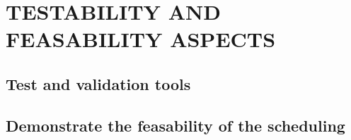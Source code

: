 
\chapter{TESTABILITY AND FEASABILITY ASPECTS}
\doMinitoc

\section{Test and validation tools}

\section{Demonstrate the feasability of the scheduling}

